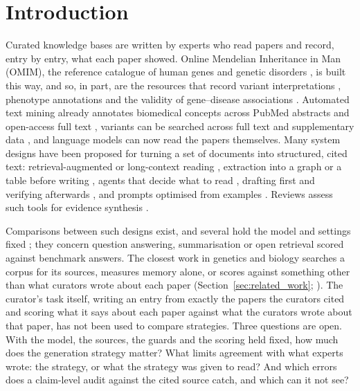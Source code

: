 \documentclass{article} %
\begin{document}
\section{Introduction}
\label{sec:intro}
Curated knowledge bases are written by experts who read papers and record, entry by entry, what each paper showed. Online Mendelian Inheritance in Man (OMIM), the reference catalogue of human genes and genetic disorders \citep{Amberger2014OmimorgOnline,amberger2019omim,hamosh2021online}, is built this way, and so, in part, are the resources that record variant interpretations \citep{Landrum2017ClinvarImproving,landrum2025clinvar}, phenotype annotations \citep{robinson2008human,gargano2024human} and the validity of gene--disease associations \citep{strande2017evaluating}. Automated text mining already annotates biomedical concepts across PubMed abstracts and open-access full text \citep{Wei2019PubtatorCentral,wei2024pubtator}, variants can be searched across full text and supplementary data \citep{allot2023tracking}, and language models can now read the papers themselves. Many system designs have been proposed for turning a set of documents into structured, cited text: retrieval-augmented or long-context reading \citep{Lewis2020RetrievalaugmentedGeneration,li2024retrieval}, extraction into a graph or a table before writing \citep{edge2024local,joshi2026sliders}, agents that decide what to read \citep{Nakano2021WebgptBrowserassisted,Lla2023PaperqaRetrievalaugmented,skarlinski2024language}, drafting first and verifying afterwards \citep{Gao2022RarrResearching,dhuliawala2024chainofverification}, and prompts optimised from examples \citep{Khattab2023DspyCompiling,agrawal2026gepa}. Reviews assess such tools for evidence synthesis \citep{Clark2025GenerativeArtificial,scherbakov2025emergence,cao2025automation,wang2025accelerating}.

Comparisons between such designs exist, and several hold the model and settings fixed \citep{li2024retrieval,Li2025LaraBenchmarking,han2025rag}; they concern question answering, summarisation or open retrieval scored against benchmark answers. The closest work in genetics and biology searches a corpus for its sources, measures memory alone, or scores against something other than what curators wrote about each paper (Section~\ref{sec:related_work}; \citealp{zhang2026flyaoc,yan2026genknowrd,skarlinski2024language,groza2026systematic}). The curator's task itself, writing an entry from exactly the papers the curators cited and scoring what it says about each paper against what the curators wrote about that paper, has not been used to compare strategies. Three questions are open. With the model, the sources, the guards and the scoring held fixed, how much does the generation strategy matter? What limits agreement with what experts wrote: the strategy, or what the strategy was given to read? And which errors does a claim-level audit against the cited source catch, and which can it not see?
\end{document}
